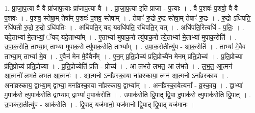 \documentclass[17pt]{extarticle}
\begin{document}
1. प्रा॒जा॒प॒त्या वै वै प्रा॑जाप॒त्याः प्रा॑जाप॒त्या वै । . प्रा॒जा॒प॒त्या इति॑ प्राजा - प॒त्याः । . वै प॒शवः॑ प॒शवो॒ वै वै प॒शवः॑ । . प॒शव॒ स्तेषा॒म् तेषा᳚म् प॒शवः॑ प॒शव॒ स्तेषा᳚म् । . तेषाꣳ॑ रु॒द्रो रु॒द्र स्तेषा॒म् तेषाꣳ॑ रु॒द्रः । . रु॒द्रो ऽधि॑पति॒ रधि॑पती रु॒द्रो रु॒द्रो ऽधि॑पतिः । . अधि॑पति॒र् यद् यदधि॑पति॒ रधि॑पति॒र् यत् । . अधि॑पति॒रित्यधि॑ - प॒तिः॒ । . यदे॒ताभ्या॑ मे॒ताभ्यां॒ ॅयद् यदे॒ताभ्या᳚म् । . ए॒ताभ्या॑ मुपाक॒रो त्यु॑पाक॒रो त्ये॒ताभ्या॑ मे॒ताभ्या॑ मुपाक॒रोति॑ । . उ॒पा॒क॒रोति॒ ताभ्या॒म् ताभ्या॑ मुपाक॒रो त्यु॑पाक॒रोति॒ ताभ्या᳚म् । . उ॒पा॒क॒रोतीत्यु॑प - आ॒क॒रोति॑ । . ताभ्या॑ मे॒वैव ताभ्या॒म् ताभ्या॑ मे॒व । . ए॒वैन॑ मेन मे॒वैवैन᳚म् । . ए॒न॒म् प्र॒ति॒प्रोच्य॑ प्रति॒प्रोच्यै॑न मेनम् प्रति॒प्रोच्य॑ । . प्र॒ति॒प्रोच्या प्र॑ति॒प्रोच्य॑ प्रति॒प्रोच्या । . प्र॒ति॒प्रोच्येति॑ प्रति - प्रोच्य॑ । . आ ल॑भते लभत॒ आ ल॑भते । . ल॒भ॒त॒ आ॒त्मन॑ आ॒त्मनो॑ लभते लभत आ॒त्मनः॑ । . आ॒त्मनो ऽना᳚व्रस्का॒या ना᳚व्रस्काया॒ त्मन॑ आ॒त्मनो ऽना᳚व्रस्काय । . अना᳚व्रस्काय॒ द्वाभ्या॒म् द्वाभ्या॒ मना᳚व्रस्का॒या ना᳚व्रस्काय॒ द्वाभ्या᳚म् । . अना᳚व्रस्का॒येत्यना᳚ - व्र॒स्का॒य॒ । . द्वाभ्या॑ मु॒पाक॑रो त्यु॒पाक॑रोति॒ द्वाभ्या॒म् द्वाभ्या॑ मु॒पाक॑रोति । . उ॒पाक॑रोति द्वि॒पाद् द्वि॒पा दु॒पाक॑रो त्यु॒पाक॑रोति द्वि॒पात् । . उ॒पाक॑रा॒तीत्यु॑प - आक॑रोति । . द्वि॒पाद् यज॑मानो॒ यज॑मानो द्वि॒पाद् द्वि॒पाद् यज॑मानः । \newline
\end{document}
